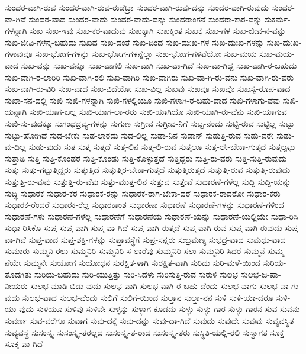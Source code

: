 {ಸುಂದರ-ವಾಗಿ-ರುವ
ಸುಂದರ-ವಾಗಿ-ರುವ-ರುಡೆಟ್ರಾ
ಸುಂದರ-ವಾಗಿ-ರುವು-ದನ್ನು
ಸುಂದರ-ವಾಗಿ-ರುವುದು
ಸುಂದರ-ವಾ-ಗಿವೆ
ಸುಂದರ-ವಾದ
ಸುಂದರ-ವಾದು
ಸುಂದರ-ವಾದು-ದನ್ನು
ಸುಂದರಾಂಗನೆ
ಸುಂದರಾ-ಕಾರ-ವನ್ನು
ಸುಕರ್ಮ-ಗಳನ್ನಾಗಿ
ಸುಖ
ಸುಖ-ಇವು
ಸುಖ-ಕರ-ವಾದುವು
ಸುಖಕ್ಕಾಗಿ
ಸುಖಕ್ಕಿಂತ
ಸುಖಕ್ಕೆ
ಸುಖ-ಗಳ
ಸುಖ-ಜೀವ-ನ-ವನ್ನು
ಸುಖ-ಜೀವಿ-ಗಳೆನ್ನ-ಬಹುದು
ಸುಖದ
ಸುಖ-ದಂತೆ
ಸುಖ-ದಿಂದ
ಸುಖ-ದುಃಖ-ಗಳ
ಸುಖ-ದುಃಖ-ಗಳನ್ನು
ಸುಖ-ದುಃಖ-ಗಳಾವುವೂ
ಸುಖ-ಭೋಗ-ಗಳನ್ನು
ಸುಖ-ಭೋಗ-ಗಳನ್ನೆಲ್ಲಾ
ಸುಖ-ಭೋಗ-ಗಳಿವೆಯೋ
ಸುಖ-ಮಯ
ಸುಖ-ಮಯ-ವಾದ
ಸುಖ-ವನ್ನು
ಸುಖ-ವನ್ನೂ
ಸುಖ-ವಾಗಲಿ
ಸುಖ-ವಾಗಿ
ಸುಖ-ವಾ-ಗಿದೆ
ಸುಖ-ವಾ-ಗಿದ್ದ
ಸುಖ-ವಾಗಿ-ರ-ಬಹುದು
ಸುಖ-ವಾಗಿ-ರ-ಲಾರಿರಿ
ಸುಖ-ವಾಗಿ-ರಲಿ
ಸುಖ-ವಾಗಿರಿ
ಸುಖ-ವಾಗಿರು
ಸುಖ-ವಾ-ಗಿ-ರು-ವನು
ಸುಖ-ವಾಗಿ-ರು-ವರು
ಸುಖ-ವಾಗಿ-ರು-ವಿರಿ
ಸುಖ-ವಾದ
ಸುಖ-ವಿದೆಯೋ
ಸುಖ-ವಿಲ್ಲ
ಸುಖವು
ಸುಖವೂ
ಸುಖವೊ
ಸುಖಸ್ವ-ರೂಪ-ವಾದ
ಸುಖಾ-ಸನ-ದಲ್ಲಿ
ಸುಖಿ
ಸುಖಿ-ಗಳನ್ನಾಗಿ
ಸುಖಿ-ಗಳಲ್ಲಿಯೂ
ಸುಖಿ-ಗಳಾಗಿ-ರ-ಬಹು-ದಾದ
ಸುಖಿ-ಗಳಾಗು-ವೆವು
ಸುಖಿ-ಯನ್ನಾಗಿ
ಸುಖಿ-ಯಾಗ-ಬಲ್ಲ
ಸುಖಿ-ಯಾಗ-ಲಾ-ರರು
ಸುಖಿ-ಯಾಗಿಯೊ
ಸುಖಿ-ಯಾಗಿ-ರು-ವೆನು
ಸುಖಿ-ಯಾಗುವ
ಸುಖಿ-ಸು-ವುದಕ್ಕೂ
ಸುಗಂಧದ್ರವ್ಯ-ಗಳನ್ನು
ಸುಗುಣ
ಸುಗ್ರೀವ
ಸುಗ್ರೀವ-ನಿಗೆ
ಸುಟ್ಟ-ನೆಂದು
ಸುಟ್ಟಿ-ರುವ
ಸುಟ್ಟಿಲ್ಲ
ಸುಟ್ಟು
ಸುಟ್ಟು-ಹೋಗಿದೆ
ಸುಡ-ಬೇಕು
ಸುಡ-ಲಾರದು
ಸುಡ-ಲಿಲ್ಲ
ಸುಡಾ-ನಿನ
ಸುಡಾನ್
ಸುಡುತ್ತಿ-ರುವ
ಸುಡು-ವರೇ
ಸುಡು-ವು-ದಿಲ್ಲ
ಸುಡು-ವುದು
ಸುತ
ಸುತ್ತ
ಸುತ್ತದೆ
ಸುತ್ತ-ಲಿನ
ಸುತ್ತ-ಲಿ-ರುವ
ಸುತ್ತಲೂ
ಸುತ್ತ-ಲೇ-ಬೇಕಾ-ಗುತ್ತದೆ
ಸುತ್ತಲ್ಪಟ್ಟು
ಸುತ್ತಾಡಿ
ಸುತ್ತಿ
ಸುತ್ತಿ-ಕೊಂಡರೆ
ಸುತ್ತಿ-ಕೊಂಡು
ಸುತ್ತಿ-ಕೊಳ್ಳುತ್ತದೆ
ಸುತ್ತಿದ್ದರು
ಸುತ್ತಿ-ರು-ವರು
ಸುತ್ತಿ-ಸುತ್ತಿ-ರುವುದು
ಸುತ್ತು
ಸುತ್ತು-ಗಟ್ಟುತ್ತಿದ್ದರು
ಸುತ್ತುತ್ತಿದೆ
ಸುತ್ತುತ್ತಿರ-ಬೇಕಾ-ಗುತ್ತದೆ
ಸುತ್ತುತ್ತಿರುತ್ತದೆ
ಸುತ್ತುತ್ತಿ-ರುವ
ಸುತ್ತುತ್ತಿ-ರುವುದು
ಸುತ್ತುತ್ತಿ-ರು-ವುವು
ಸುತ್ತುತ್ತಿ-ರು-ವೆವು
ಸುತ್ತು-ಮುತ್ತ-ಲಿನ
ಸುತ್ತುವ
ಸುತ್ತೇವೆ
ಸುದಾರಣೆ-ಗಳೆಲ್ಲ
ಸುದ್ದಿ
ಸುದ್ದಿ-ಯನ್ನು
ಸುದ್ಧಿ
ಸುಧಾರಕ
ಸುಧಾರ-ಕರ
ಸುಧಾರಕ-ರನ್ನು
ಸುಧಾರಕ-ರಾಗ-ಬೇಕಾ-ದರೆ
ಸುಧಾರಕ-ರಾದರೋ
ಸುಧಾರ-ಕರು
ಸುಧಾರಕ-ರೆಂದರೆ
ಸುಧಾರಕ-ರೆಲ್ಲ
ಸುಧಾರಕಾಂಶ
ಸುಧಾರಣಾ
ಸುಧಾರಣೆ
ಸುಧಾರಣೆ-ಗಳನ್ನು
ಸುಧಾರಣೆ-ಗಳಿಂದ
ಸುಧಾರಣೆ-ಗಳು
ಸುಧಾರಣೆ-ಗಳೆಲ್ಲ
ಸುಧಾರಣೆಗೆ
ಸುಧಾರಣೆಯ
ಸುಧಾರಣೆ-ಯನ್ನು
ಸುಧಾರಣೆ-ಯಲ್ಲಿಯೇ
ಸುಧಾ-ರಿಸಿ
ಸುಧಾ-ರಿಸಿಕೊ
ಸುಪ್ತ
ಸುಪ್ತ-ವಾಗಿ
ಸುಪ್ತ-ವಾ-ಗಿದೆ
ಸುಪ್ತ-ವಾಗಿ-ರುತ್ತದೆ
ಸುಪ್ತ-ವಾಗಿ-ರುವ
ಸುಪ್ತ-ವಾಗಿ-ರುವುದು
ಸುಪ್ತ-ವಾ-ಗಿವೆ
ಸುಪ್ತ-ವಾದ
ಸುಪ್ತ-ಶಕ್ತಿ-ಗಳನ್ನು
ಸುಪ್ತಾವಸ್ಥೆಗೆ
ಸುಪ್ರ-ಸನ್ನರು
ಸುಬ್ರಮಣ್ಯ
ಸುಭದ್ರ-ವಾದ
ಸುಮಧು-ವಾದ
ಸುಮಾರು
ಸುಮ್ಮನಿ-ರಲು
ಸುಮ್ಮನಿರಿ
ಸುಮ್ಮನಿರಿ-ಸ-ಲಾರೆವು
ಸುಮ್ಮನಿರಿ-ಸಲು
ಸುಮ್ಮನಿರಿ-ಸಿದರೆ
ಸುಮ್ಮನೆ
ಸುಮ್ಮ-ನೆಯೇ
ಸುಮ್ಮನೇ
ಸುಯೋಗ
ಸುಯೋಧನ
ಸುರಕ್ಷಿತ-ಳಾಗಿ
ಸುರಕ್ಷಿತ-ವಾಗಿ
ಸುರಿದು
ಸುರಿ-ಮಳೆ-ಯಿಂದ
ಸುರಿಯ-ತೊಡಗಿತು
ಸುರಿಯ-ಬಹುದು
ಸುರಿ-ಯುತ್ತಿತ್ತು
ಸುರಿ-ಸಿದಳು
ಸುರಿಸುತ್ತಿ-ರುವ
ಸುರುಳಿ
ಸುಲಭ
ಸುಲಭ-ಜ-ಪಾ-ನೀಯರು
ಸುಲಭ-ಮಾಡಿ-ಬಿಡು-ವುದು
ಸುಲಭ-ವಾಗಿ
ಸುಲಭ-ವಾಗಿ-ರ-ಬಹು-ದೆಂದು
ಸುಲಭ-ವಾಗು
ಸುಲಭ-ವಾ-ಗು-ವುದು
ಸುಲಭ-ವಾದ
ಸುಲಭ-ವೆಂದು
ಸುಲಿಗೆ
ಸುಲಿಗೆ-ಯಿಂದ
ಸುಲ್ತಾನ
ಸುಲ್ತಾ-ನನ
ಸುಳಿ
ಸುಳಿ-ಯಾ-ದರೂ
ಸುಳಿ-ಯು-ವುದು
ಸುಳಿಯೂ
ಸುಳಿವು
ಸುಳಿವೇ
ಸುಳ್ಳನ್ನು
ಸುಳ್ಳಾಗ-ಕೂಡದು
ಸುಳ್ಳು
ಸುಳ್ಳು-ಗಾರ
ಸುಳ್ಳು-ಗಾರನ
ಸುವ
ಸುವನು
ಸುವರ್ಣ
ಸುವ-ವರೆಗೂ
ಸುವಾಗ
ಸುವು-ದಕ್ಕೆ
ಸುವು-ದನ್ನು
ಸುವು-ದಾ-ಗಿದೆ
ಸುವುದು
ಸುವುದೇ
ಸುವುವು
ಸುವ್ಯವಸ್ಥಿತ
ಸುವ್ಯವಸ್ಥೆ
ಸುಸಂಸ್ಕೃ
ಸುಸಂಸ್ಕೃ-ತರಲ್ಲದ
ಸುಸಂಸ್ಕೃ-ತ-ರಾದ
ಸುಸಂಸ್ಕೃ-ತರು
ಸುಸ್ಥಿತಿ-ಯಲ್ಲಿ-ರಲಿ
ಸುಸ್ವಾಗತ
ಸೂಕ್ತ
ಸೂಕ್ತ-ವಾ-ಗಿದೆ
}
